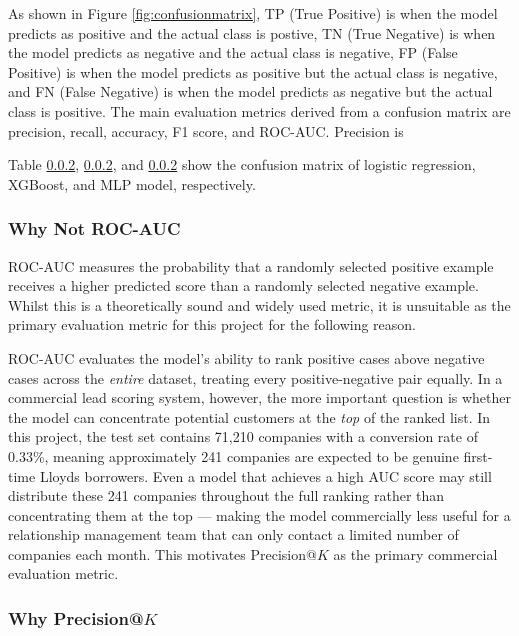 \documentclass[ %
                    author={Natchalin Iwsakul \\ Inkaphol Siriwongwattana \\ Tanaphan Kummaraphat \\ Patorn Srisupap},
                supervisor={Fernando Moreno-Pino},
                    degree={MSc},
                     title={Propensity Modelling for SME Commercial Lending Using Open Public Data},
                  subtitle={Companies House filings and GDELT media coverage as predictors of first-time borrowing},
                      type={},
                      year={2026}]{dissertation}
\begin{document}
As shown in Figure \ref{fig:confusionmatrix}, TP (True Positive) is when the model predicts as positive and the actual class is postive, TN (True Negative) is when the model predicts as negative and the actual class is negative, FP (False Positive) is when the model predicts as positive but the actual class is negative, and FN (False Negative) is when the model predicts as negative but the actual class is positive. The main evaluation metrics derived from a confusion matrix are precision, recall, accuracy, F1 score, and ROC-AUC. Precision is 

Table \ref{}, \ref{}, and \ref{} show the confusion matrix of logistic regression, XGBoost, and MLP model, respectively.


\subsubsection{Why Not ROC-AUC}

ROC-AUC measures the probability that a randomly selected
positive example receives a higher predicted score than a
randomly selected negative example. Whilst this is a
theoretically sound and widely used metric, it is unsuitable
as the primary evaluation metric for this project for the
following reason.

ROC-AUC evaluates the model's ability to rank positive cases
above negative cases across the \emph{entire} dataset,
treating every positive-negative pair equally. In a
commercial lead scoring system, however, the more important
question is whether the model can concentrate potential
customers at the \emph{top} of the ranked list. In this
project, the test set contains 71,210 companies with a
conversion rate of 0.33\%, meaning approximately 241
companies are expected to be genuine first-time Lloyds
borrowers. Even a model that achieves a high AUC score may
still distribute these 241 companies throughout the full
ranking rather than concentrating them at the top --- making
the model commercially less useful for a relationship
management team that can only contact a limited number of
companies each month. This motivates Precision@$K$ as the
primary commercial evaluation metric.

\subsubsection{Why Precision@$K$}
\end{document}
